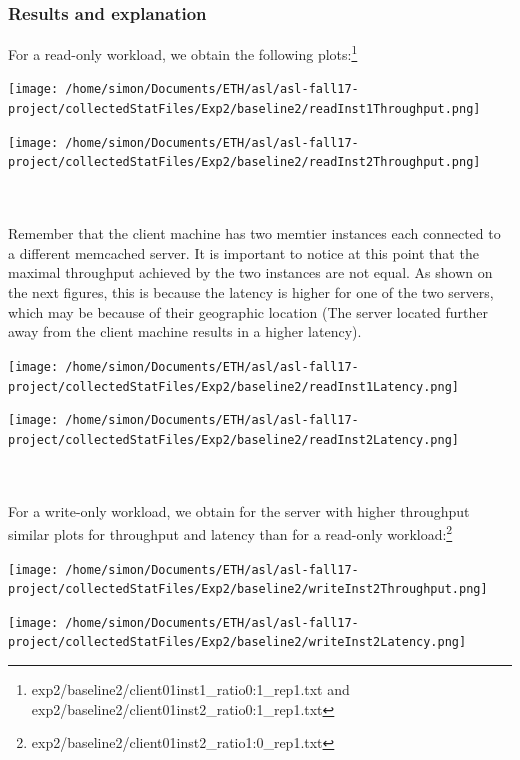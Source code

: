 \documentclass[11pt,a4paper]{article}
\begin{document}
\subsubsection{Results and explanation}
For a read-only workload, we obtain the following plots:\footnote{exp2/baseline2/client01inst1\_ratio0:1\_rep1.txt and exp2/baseline2/client01inst2\_ratio0:1\_rep1.txt}
\\
\begin{minipage}{0.5\linewidth}
\texttt{[image: /home/simon/Documents/ETH/asl/asl-fall17-project/collectedStatFiles/Exp2/baseline2/readInst1Throughput.png]}
\end{minipage}
\hfill
\begin{minipage}{0.5\linewidth}
\texttt{[image: /home/simon/Documents/ETH/asl/asl-fall17-project/collectedStatFiles/Exp2/baseline2/readInst2Throughput.png]}
\end{minipage}
\\\\
Remember that the client machine has two memtier instances each connected to a different memcached server. It is important to notice at this point that the maximal throughput achieved by the two instances are not equal. As shown on the next figures, this is because the latency is higher for one of the two servers, which may be because of their geographic location (The server located further away from the client machine results in a higher latency).
\begin{minipage}{0.5\linewidth}
\texttt{[image: /home/simon/Documents/ETH/asl/asl-fall17-project/collectedStatFiles/Exp2/baseline2/readInst1Latency.png]}
\end{minipage}
\hfill
\begin{minipage}{0.5\linewidth}
\texttt{[image: /home/simon/Documents/ETH/asl/asl-fall17-project/collectedStatFiles/Exp2/baseline2/readInst2Latency.png]}
\end{minipage}
\\\\
For a write-only workload, we obtain for the server with higher throughput similar plots for throughput and latency than for a read-only workload:\footnote{exp2/baseline2/client01inst2\_ratio1:0\_rep1.txt}
\\
\begin{minipage}{0.5\linewidth}
\texttt{[image: /home/simon/Documents/ETH/asl/asl-fall17-project/collectedStatFiles/Exp2/baseline2/writeInst2Throughput.png]}
\end{minipage}
\hfill
\begin{minipage}{0.5\linewidth}
\texttt{[image: /home/simon/Documents/ETH/asl/asl-fall17-project/collectedStatFiles/Exp2/baseline2/writeInst2Latency.png]}
\end{minipage}
\end{document}
